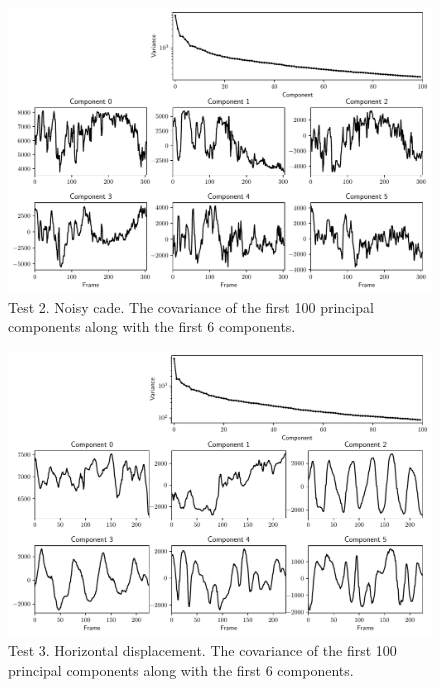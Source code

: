 \documentclass{article}
\begin{document}
    \begin{figure}[p]
        \includegraphics[width=\textwidth]{PCA_2.pdf}
        \caption{Test 2. Noisy cade. The covariance of the first 100 principal
        components along with the first 6 components. \label{fig:test_2}}
    \end{figure}

    \begin{figure}[p]
        \includegraphics[width=\textwidth]{PCA_3.pdf}
        \caption{Test 3. Horizontal displacement. The covariance of the first
        100 principal components along with the first 6 components.
        \label{fig:test_3}}
    \end{figure}
\end{document}
